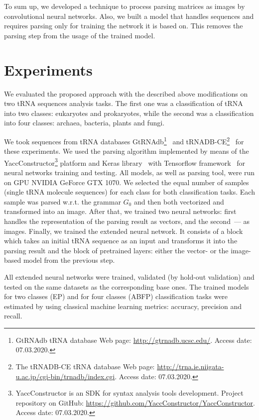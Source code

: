 \documentclass[runningheads]{llncs}
\begin{document}
To sum up, we developed a technique to process parsing matrices as images by convolutional neural networks. Also, we built a model that handles sequences and requires parsing only for training the network it is based on. This removes the parsing step from the usage of the trained model.

\section{Experiments}
We evaluated the proposed approach with the described above modifications on two tRNA sequences analysis tasks.
The first one was a classification of tRNA into two classes: eukaryotes and prokaryotes, while the second was a classification into four classes: archaea, bacteria, plants and fungi.


We took sequences from tRNA databases GtRNAdb\footnote{GtRNAdb tRNA database Web page: \url{http://gtrnadb.ucsc.edu/}. Access date: 07.03.2020.}~\cite{chan2016gtrnadb} and tRNADB-CE\footnote{The tRNADB-CE tRNA database Web page: \url{http://trna.ie.niigata-u.ac.jp/cgi-bin/trnadb/index.cgi}. Access date: 07.03.2020.}~\cite{abe2014trnadb} for these experiments.
We used the parsing algorithm implemented by means of the YaccConstructor\footnote{YaccConstructor is an SDK for syntax analysis tools development. Project repository on GitHub: \url{https://github.com/YaccConstructor/YaccConstructor}. Access date: 07.03.2020.} platform and Keras library~\cite{chollet2015keras} with Tensorflow framework~\cite{tensorflow2015-whitepaper} for neural networks training and testing.
All models, as well as parsing tool, were run on GPU NVIDIA GeForce GTX 1070.
We selected the equal number of samples (single tRNA molecule sequences) for each class for both classification tasks.
Each sample was parsed w.r.t. the grammar $G_0$ and then both vectorized and transformed into an image.
After that, we trained two neural networks: first handles the representation of the parsing result as vectors, and the second~--- as images.
Finally, we trained the extended neural network.
It consists of a block which takes an initial tRNA sequence as an input and transforms it into the parsing result and the block of pretrained layers: either the vector- or the image-based model from the previous step. 

All extended neural networks were trained, validated (by hold-out validation) and tested on the same datasets as the corresponding base ones.
The trained models for two classes (EP) and for four classes (ABFP) classification tasks were estimated by using classical machine learning metrics: accuracy, precision and recall.
\end{document}
